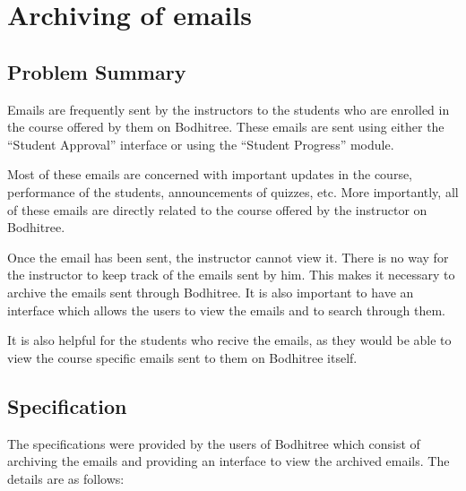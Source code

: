 \section{Archiving of emails}

\subsection{Problem Summary}

\hspace{0.35cm} Emails are frequently sent by the instructors to the students who are enrolled in the course offered by them on Bodhitree. These emails are sent using either the ``Student Approval'' interface or using the ``Student Progress'' module.
\par Most of these emails are concerned with important updates in the course, performance of the students, announcements of quizzes, etc. More importantly, all of these emails are directly related to the course offered by the instructor on Bodhitree.
\par Once the email has been sent, the instructor cannot view it. There is no way for the instructor to keep track of the emails sent by him. This makes it necessary to archive the emails sent through Bodhitree. It is also important to have an interface which allows the users to view the emails and to search through them.
\par It is also helpful for the students who recive the emails, as they would be able to view the course specific emails sent to them on Bodhitree itself.

\subsection{Specification}

The specifications were provided by the users of Bodhitree which consist of archiving the emails and providing an interface to view the archived emails. The details are as follows:

